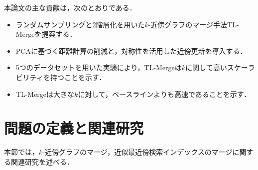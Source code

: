 \documentclass[submit,techrep,noauthor]{ipsj}
\newcommand{\R}{\mathbb{R}}
\newcommand{\vb}[1]{\boldsymbol{#1}}
\begin{document}
本論文の主な貢献は，次のとおりである．
\begin{itemize}
	\item ランダムサンプリングと2階層化を用いた$k$-近傍グラフのマージ手法TL-Mergeを提案する．
	\item PCAに基づく距離計算の削減と，対称性を活用した近傍更新を導入する．
	\item 5つのデータセットを用いた実験により，TL-Mergeは$k$に関して高いスケーラビリティを持つことを示す．
	\item TL-Mergeは大きな$k$に対して，ベースラインよりも高速であることを示す．
\end{itemize}



\section{問題の定義と関連研究}
\label{sec:related-work}
本節では，$k$-近傍グラフのマージ，近似最近傍検索インデックスのマージに関する関連研究を述べる．




\end{document}
